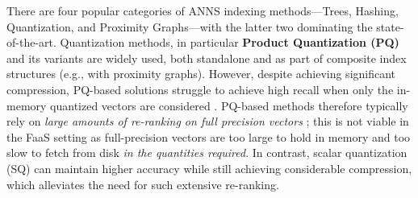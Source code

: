 There are four popular categories of ANNS indexing methods---Trees, Hashing, Quantization, and Proximity Graphs---with the latter two dominating the state-of-the-art. Quantization methods, in particular \textbf{Product Quantization (PQ)} and its variants \cite{TuncelFerhatosmanoglu2002VQIndex, Jegou2011PQ, OptimizedProductQuantization, VarianceAwareQuantization, NEURIPS2023-Wang-NHQ} are widely used, both standalone and as part of composite index structures (e.g., with proximity graphs). 
However, despite achieving significant compression, PQ-based solutions struggle to achieve high recall when only the in-memory quantized vectors are considered \cite{Niu2023ResidualVectorProductQuantization, FaissMissingManual, RabitQ2024, Noh_2021_ICCV_PQ_Recall}.
PQ-based methods therefore typically rely on \textit{large amounts of re-ranking on full precision vectors} \cite{RabitQ2024}; this is not viable in the FaaS setting as full-precision vectors are too large to hold in memory and too slow to fetch from disk \textit{in the quantities required}. In contrast, scalar quantization (SQ) can maintain higher accuracy while still achieving considerable compression, which alleviates the need for such extensive re-ranking.

